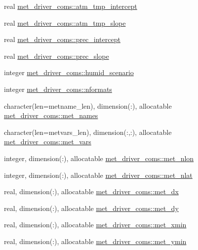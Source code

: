 \begin{DoxyCompactItemize}
\item 
real \hyperlink{namespacemet__driver__coms_a2de0be53549400d64a282d3855baab65}{met\+\_\+driver\+\_\+coms\+::atm\+\_\+tmp\+\_\+intercept}
\item 
real \hyperlink{namespacemet__driver__coms_ab3817d72cc9b0c3aa3448963c86030a0}{met\+\_\+driver\+\_\+coms\+::atm\+\_\+tmp\+\_\+slope}
\item 
real \hyperlink{namespacemet__driver__coms_a274fef5f44b832144db4ea49b63fc125}{met\+\_\+driver\+\_\+coms\+::prec\+\_\+intercept}
\item 
real \hyperlink{namespacemet__driver__coms_a3ef2c9529b9897ae7c7d1d595e0e60a5}{met\+\_\+driver\+\_\+coms\+::prec\+\_\+slope}
\item 
integer \hyperlink{namespacemet__driver__coms_a3c0f07127c6ae40ccab056c9a8a2685b}{met\+\_\+driver\+\_\+coms\+::humid\+\_\+scenario}
\item 
integer \hyperlink{namespacemet__driver__coms_abe5693ed3bf2168167db941bc9f61eb2}{met\+\_\+driver\+\_\+coms\+::nformats}
\item 
character(len=metname\+\_\+len), dimension(\+:), allocatable \hyperlink{namespacemet__driver__coms_ad156536306a276f36f80dcdaa8cc5858}{met\+\_\+driver\+\_\+coms\+::met\+\_\+names}
\item 
character(len=metvars\+\_\+len), dimension(\+:,\+:), allocatable \hyperlink{namespacemet__driver__coms_ac06aba05a287b0335168be56f48121ab}{met\+\_\+driver\+\_\+coms\+::met\+\_\+vars}
\item 
integer, dimension(\+:), allocatable \hyperlink{namespacemet__driver__coms_aff461244978aff6f00517c80972b0f23}{met\+\_\+driver\+\_\+coms\+::met\+\_\+nlon}
\item 
integer, dimension(\+:), allocatable \hyperlink{namespacemet__driver__coms_a6e01457f55b0c5e2a590116d6ce16ee0}{met\+\_\+driver\+\_\+coms\+::met\+\_\+nlat}
\item 
real, dimension(\+:), allocatable \hyperlink{namespacemet__driver__coms_a668ed875098df886a584635cacc54975}{met\+\_\+driver\+\_\+coms\+::met\+\_\+dx}
\item 
real, dimension(\+:), allocatable \hyperlink{namespacemet__driver__coms_aef439931abb5d16ef45ab6a678c931a6}{met\+\_\+driver\+\_\+coms\+::met\+\_\+dy}
\item 
real, dimension(\+:), allocatable \hyperlink{namespacemet__driver__coms_a8575ea044c0d18d0281c955f3446f606}{met\+\_\+driver\+\_\+coms\+::met\+\_\+xmin}
\item 
real, dimension(\+:), allocatable \hyperlink{namespacemet__driver__coms_af9ef42e3bc6984aedb394f464c861d2a}{met\+\_\+driver\+\_\+coms\+::met\+\_\+ymin}

\end{DoxyCompactItemize}
